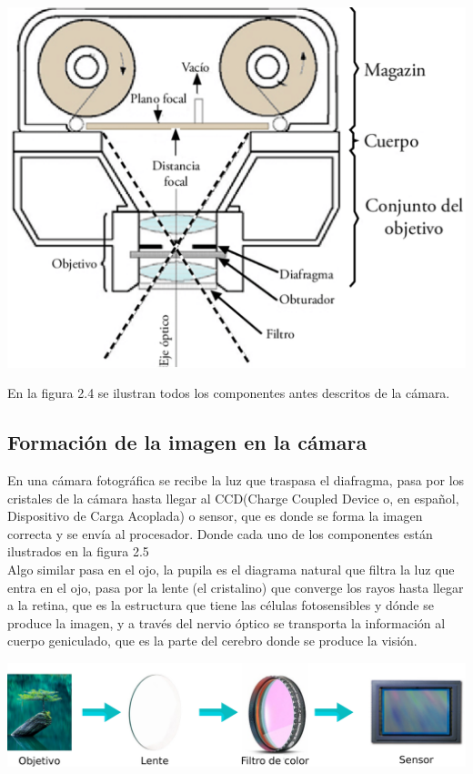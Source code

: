 \begin{center}
	\includegraphics[width=0.80 \textwidth]{Contenido/Cuerpo/Capitulo2/Fig1_5.eps}
	\label{fig:MarcoTeorico:Fig4}
\end{center}
En la figura 2.4 se ilustran todos los componentes antes descritos de la cámara.

\subsection{Formación de la imagen en la cámara}
En una cámara fotográfica se recibe la luz que traspasa el diafragma, pasa por los
cristales de la cámara hasta llegar al CCD(Charge Coupled Device o, en español,
Dispositivo de Carga Acoplada) o sensor, que es donde se forma la imagen correcta y se
envía al procesador. Donde cada uno de los componentes están ilustrados en la figura 2.5\\
Algo similar pasa en el ojo, la pupila es el diagrama natural que filtra la luz que
entra en el ojo, pasa por la lente (el cristalino)  que converge los rayos hasta
llegar a la retina, que es la estructura que tiene las células fotosensibles y dónde
se produce la imagen, y a través del nervio óptico se transporta la información al
cuerpo geniculado, que es la parte del cerebro donde se produce la visión.
\begin{center}
	\includegraphics[width=1.0 \textwidth]{Contenido/Cuerpo/Capitulo2/Fig1_6.eps}
	\label{fig:MarcoTeorico:Fig5}
\end{center}


